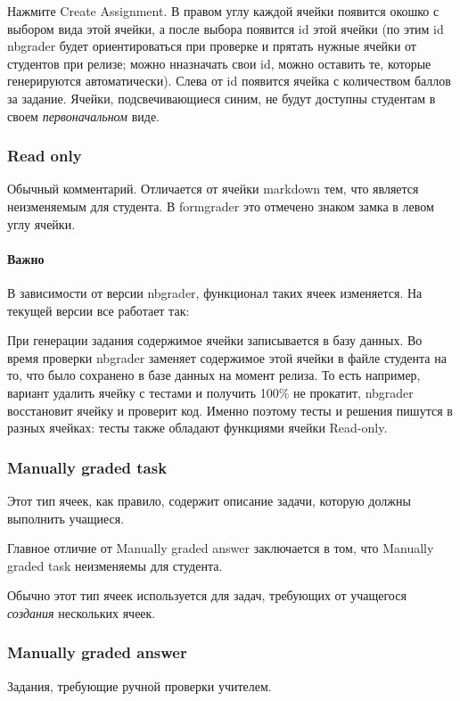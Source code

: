 \documentclass[a4paper,12pt]{article}
\begin{document}
Нажмите Create Assignment. В правом углу каждой ячейки появится окошко с выбором вида этой ячейки, а после выбора появится id этой ячейки (по этим id nbgrader будет ориентироваться при проверке и прятать нужные ячейки от студентов при релизе; можно нназначать свои id, можно оставить те, которые генерируются автоматически). Слева от id появится ячейка с количеством баллов за задание. Ячейки, подсвечивающиеся синим, не будут доступны студентам в своем \textit{первоначальном} виде.

\subsubsection{Read only}

Обычный комментарий. Отличается от ячейки markdown тем, что является неизменяемым для студента. В formgrader это отмечено знаком замка в левом углу ячейки.
\paragraph{Важно}
В зависимости от версии nbgrader, функционал таких ячеек изменяется. На текущей версии все работает так:

При генерации задания содержимое ячейки записывается в базу данных. Во время проверки nbgrader заменяет содержимое этой ячейки в файле студента на то, что было сохранено в базе данных на момент релиза. То есть например, вариант удалить ячейку с тестами и получить 100\% не прокатит, nbgrader восстановит ячейку и проверит код. Именно поэтому тесты и решения пишутся в разных ячейках: тесты также обладают функциями ячейки Read-only. 
\subsubsection{Manually graded task}

Этот тип ячеек, как правило, содержит описание задачи, которую должны выполнить учащиеся.

Главное отличие от Manually graded answer заключается в том, что Manually graded task неизменяемы для студента. 

Обычно этот тип ячеек используется для задач, требующих от учащегося \textit{создания} нескольких ячеек.


\subsubsection{Manually graded answer}

Задания, требующие ручной проверки учителем. 
\end{document}
